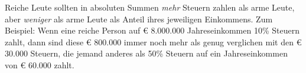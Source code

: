Reiche Leute sollten in absoluten Summen \emph{mehr} Steuern zahlen als arme Leute, aber \emph{weniger} als arme Leute als Anteil ihres jeweiligen Einkommens.
Zum Beispiel: Wenn eine reiche Person auf € 8.000.000 Jahreseinkommen 10\% Steuern zahlt, dann sind diese € 800.000 immer noch mehr als genug verglichen mit den € 30.000 Steuern, die jemand anderes als 50\% Steuern auf ein Jahreseinkommen von € 60.000 zahlt.